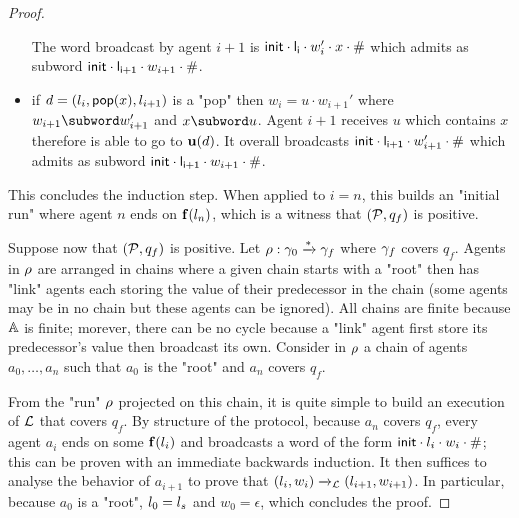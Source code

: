 \begin{proof}
\begin{itemize}
		The word broadcast by agent $i+1$ is $\mathsf{init} \cdot \mathsf{l_i} \cdot w'_i \cdot x \cdot \mathsf{\#}$ which admits as subword $\mathsf{init} \cdot \mathsf{l_{i+1}} \cdot w_{i+1} \cdot \mathsf{\#}$.
		\item if $d =(l_i, \mathsf{pop}(x), l_{i+1})$ is a "pop" then $w_{i} = u \cdot w_{i+1}'$ where $w_{i+1} \subword w_{i+1}'$ and $x \subword u$. 
		Agent $i+1$ receives $u$ which contains $x$ therefore is able to go to $\mathbf{u}(d)$. It overall broadcasts $\mathsf{init} \cdot \mathsf{l_{i+1}} \cdot w_{i+1}'  \cdot \mathsf{\#}$ which admits as subword $\mathsf{init} \cdot \mathsf{l_{i+1}} \cdot w_{i+1} \cdot \mathsf{\#}$.
	\end{itemize}
	This concludes the induction step.
	When applied to $i=n$, this builds an "initial run" where agent $n$ ends on $\mathbf{f}(l_n)$, which is a witness that $(\mathcal{P}, q_f)$ is positive.
	
	Suppose now that $(\mathcal{P}, q_f)$ is positive. Let $\rho: \gamma_0 \xrightarrow{*} \gamma_f$ where $\gamma_f$ covers $q_f$. Agents in $\rho$ are arranged in chains where a given chain starts with a "root" then has "link" agents each storing the value of their predecessor in the chain (some agents may be in no chain but these agents can be ignored). All chains are finite because $\mathbb{A}$ is finite; morever, there can be no cycle because a "link" agent first store its predecessor's value then broadcast its own. Consider in $\rho$ a chain of agents $a_0, \dots, a_n$ such that $a_0$ is the "root" and $a_n$ covers $q_f$. 
	
	From the "run" $\rho$ projected on this chain, it is quite simple to build an execution of $\mathcal{L}$ that covers $q_f$. By structure of the protocol, because $a_n$ covers $q_f$, every agent $a_i$ ends on some $\mathbf{f}(l_i)$ and broadcasts a word of the form $\mathsf{init} \cdot l_i \cdot w_i \cdot \mathsf{\#}$; this can be proven with an immediate backwards induction. It then suffices to analyse the behavior of $a_{i+1}$ to prove that $(l_i, w_i) \xrightarrow{}_{\mathcal{L}} (l_{i+1}, w_{i+1})$. In particular, because $a_0$ is a "root", $l_0 = l_s$ and $w_0 = \epsilon$, which concludes the proof. 
\end{proof}

